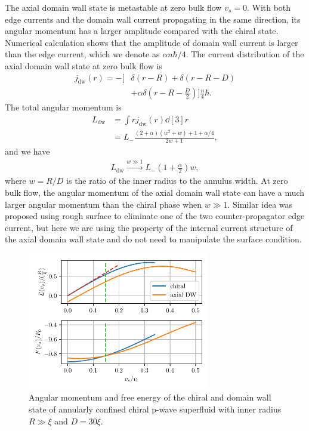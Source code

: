 \documentclass[aps,prb,reprint,groupedaddress]{revtex4-2}
\begin{document}
The axial domain wall state is metastable at zero bulk flow $v_s=0$. With both edge currents
and the domain wall current propagating in the same direction, its angular momentum has a
larger amplitude compared with the chiral state. Numerical calculation shows that the amplitude
of domain wall current is larger than the edge current, which we denote as $\alpha n\hbar/4$.
The current distribution of the axial domain wall state at zero bulk flow is
\begin{align}
    j_\text{dw}(r) = -\bigg[ & \delta(r-R) + \delta(r-R-D)\nonumber                             \\
                             & +\alpha\delta\left(r-R-\frac{D}{2}\right)\bigg]\frac{n}{4}\hbar.
\end{align}
The total angular momentum is
\begin{align}
    L_{\text{dw}} & = \int rj_\text{dw}(r)\dd[3]r\nonumber         \\
                  & =L_-\frac{(2+\alpha)(w^2+w)+1+\alpha/4}{2w+1},
\end{align}
and we have
\begin{align}
    L_{\text{dw}}\xrightarrow{w\gg 1} L_-\left(1+\frac{\alpha}{2}\right)w,
\end{align}
where $w=R/D$ is the ratio of the inner radius to the annulus width. At zero bulk flow,
the angular momentum of the axial domain wall state can have a much larger angular momentum
than the chiral phase when $w\gg 1$.  Similar idea was proposed using rough surface to
eliminate one of the two counter-propagator edge current\cite{Sauls11}, but here we are
using the property of the internal current structure of the axial domain wall state
and do not need to manipulate the surface condition.
\begin{figure}
    \centering
    \includegraphics[width=8cm]{L_v.pdf}
    \caption{Angular momentum and free energy of the chiral and domain wall state
        of annularly confined chiral p-wave superfluid with inner radius $R\gg\xi$ and $D=30\xi$.}
    \label{L_F_v}
\end{figure}
\end{document}
